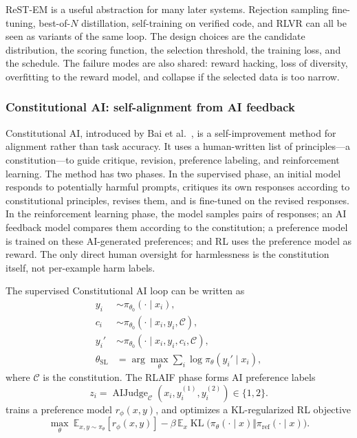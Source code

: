 ReST-EM is a useful abstraction for many later systems. Rejection sampling fine-tuning, best-of-$N$ distillation, self-training on verified code, and RLVR can all be seen as variants of the same loop. The design choices are the candidate distribution, the scoring function, the selection threshold, the training loss, and the schedule. The failure modes are also shared: reward hacking, loss of diversity, overfitting to the reward model, and collapse if the selected data is too narrow.

\subsubsection{Constitutional AI: self-alignment from AI feedback}
\label{subsubsec:constitutional-ai}

Constitutional AI, introduced by Bai et al.\ \cite{bai2022constitutional}, is a self-improvement method for alignment rather than task accuracy. It uses a human-written list of principles---a constitution---to guide critique, revision, preference labeling, and reinforcement learning. The method has two phases. In the supervised phase, an initial model responds to potentially harmful prompts, critiques its own responses according to constitutional principles, revises them, and is fine-tuned on the revised responses. In the reinforcement learning phase, the model samples pairs of responses; an AI feedback model compares them according to the constitution; a preference model is trained on these AI-generated preferences; and RL uses the preference model as reward. The only direct human oversight for harmlessness is the constitution itself, not per-example harm labels.

The supervised Constitutional AI loop can be written as
\begin{align}
    y_i &\sim \pi_{\theta_0}(\cdot\mid x_i),\\
    c_i &\sim \pi_{\theta_0}(\cdot\mid x_i,y_i,\mathcal{C}),\\
    y_i' &\sim \pi_{\theta_0}(\cdot\mid x_i,y_i,c_i,\mathcal{C}),\\
    \theta_{\mathrm{SL}} &= \arg\max_\theta \sum_i \log \pi_\theta(y_i'\mid x_i),
    \label{eq:cai-sl}
\end{align}
where $\mathcal{C}$ is the constitution. The RLAIF phase forms AI preference labels
\begin{equation}
    z_i = \operatorname{AIJudge}_{\mathcal{C}}(x_i,y_i^{(1)},y_i^{(2)})\in\{1,2\}.
    \label{eq:cai-pref}
\end{equation}
trains a preference model $r_\phi(x,y)$, and optimizes a KL-regularized RL objective
\begin{equation}
    \max_\theta\ \mathbb{E}_{x,y\sim\pi_\theta}[r_\phi(x,y)]-\beta\,\mathbb{E}_{x}\operatorname{KL}\bigl(\pi_\theta(\cdot\mid x)\Vert \pi_{\mathrm{ref}}(\cdot\mid x)\bigr).
    \label{eq:cai-rl}
\end{equation}

